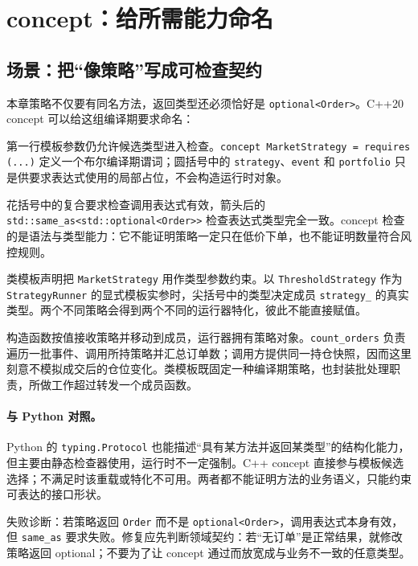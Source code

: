 \section{concept：给所需能力命名}

\subsection{场景：把“像策略”写成可检查契约}

本章策略不仅要有同名方法，返回类型还必须恰好是 \texttt{optional<Order>}。C++20 concept 可以给这组编译期要求命名：



第一行模板参数仍允许候选类型进入检查。\texttt{concept MarketStrategy = requires (...)} 定义一个布尔编译期谓词；圆括号中的 \texttt{strategy}、\texttt{event} 和 \texttt{portfolio} 只是供要求表达式使用的局部占位，不会构造运行时对象。

花括号中的复合要求检查调用表达式有效，箭头后的 \texttt{std::same\_as<std::optional<Order>>} 检查表达式类型完全一致。concept 检查的是语法与类型能力：它不能证明策略一定只在低价下单，也不能证明数量符合风控规则。

类模板声明把 \texttt{MarketStrategy} 用作类型参数约束。以 \texttt{ThresholdStrategy} 作为 \texttt{StrategyRunner} 的显式模板实参时，尖括号中的类型决定成员 \texttt{strategy\_} 的真实类型。两个不同策略会得到两个不同的运行器特化，彼此不能直接赋值。

构造函数按值接收策略并移动到成员，运行器拥有策略对象。\texttt{count\_orders} 负责遍历一批事件、调用所持策略并汇总订单数；调用方提供同一持仓快照，因而这里刻意不模拟成交后的仓位变化。类模板既固定一种编译期策略，也封装批处理职责，所做工作超过转发一个成员函数。

\paragraph{与 Python 对照。}
Python 的 \texttt{typing.Protocol} 也能描述“具有某方法并返回某类型”的结构化能力，但主要由静态检查器使用，运行时不一定强制。C++ concept 直接参与模板候选选择；不满足时该重载或特化不可用。两者都不能证明方法的业务语义，只能约束可表达的接口形状。

失败诊断：若策略返回 \texttt{Order} 而不是 \texttt{optional<Order>}，调用表达式本身有效，但 \texttt{same\_as} 要求失败。修复应先判断领域契约：若“无订单”是正常结果，就修改策略返回 optional；不要为了让 concept 通过而放宽成与业务不一致的任意类型。


